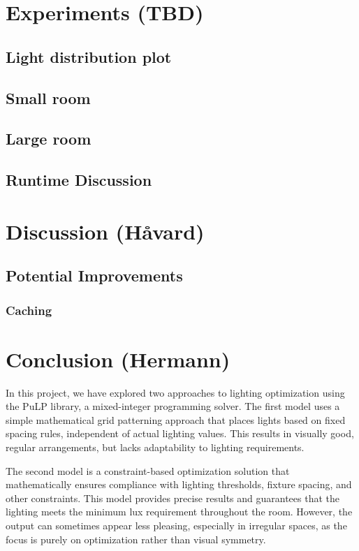 \documentclass{article}
\begin{document}
\newpage

\section{Experiments (TBD)}
\subsection{Light distribution plot}
\subsection{Small room}
\subsection{Large room}
\subsection{Runtime Discussion}



\newpage

\section{Discussion (Håvard)}

\subsection{Potential Improvements}
\subsubsection{Caching}

\newpage

\section{Conclusion (Hermann)}

In this project, we have explored two approaches to lighting optimization using the PuLP library, a mixed-integer programming solver.
The first model uses a simple mathematical grid patterning approach that places lights based on fixed spacing rules, independent of actual lighting values.
This results in visually good, regular arrangements, but lacks adaptability to lighting requirements.

The second model is a constraint-based optimization solution that mathematically ensures compliance with lighting thresholds,
fixture spacing, and other constraints. This model provides precise results and guarantees that the lighting meets the minimum lux requirement
throughout the room. However, the output can sometimes appear less pleasing, especially in irregular spaces, as the focus is purely on optimization rather than visual symmetry.
\end{document}
